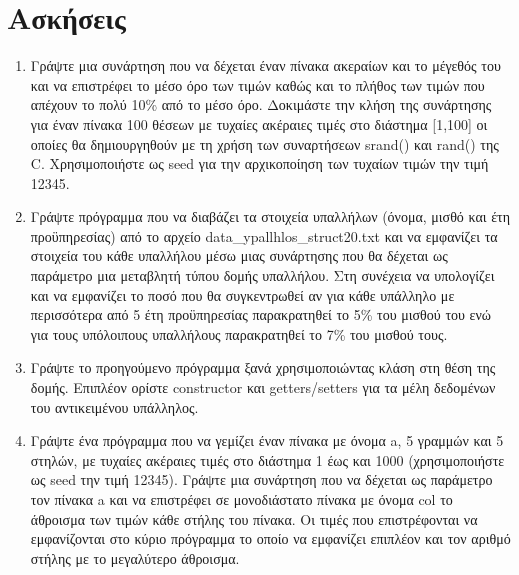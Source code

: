 \section{Ασκήσεις}
\begin{enumerate}[nolistsep]
\item Γράψτε μια συνάρτηση που να δέχεται έναν πίνακα ακεραίων και το μέγεθός του και να επιστρέφει το μέσο όρο των τιμών καθώς και το πλήθος των τιμών που απέχουν το πολύ 10\% από το μέσο όρο. Δοκιμάστε την κλήση της συνάρτησης για έναν πίνακα 100 θέσεων με τυχαίες ακέραιες τιμές στο διάστημα [1,100] οι οποίες θα δημιουργηθούν με τη χρήση των συναρτήσεων srand() και rand() της C. Χρησιμοποιήστε ως seed για την αρχικοποίηση των τυχαίων τιμών την τιμή 12345.

\item Γράψτε πρόγραμμα που να διαβάζει τα στοιχεία υπαλλήλων (όνομα, μισθό και έτη προϋπηρεσίας) από το αρχείο data\_ypallhlos\_struct20.txt και να εμφανίζει τα στοιχεία του κάθε υπαλλήλου μέσω μιας συνάρτησης που θα δέχεται ως παράμετρο μια μεταβλητή τύπου δομής υπαλλήλου. Στη συνέχεια να υπολογίζει και να εμφανίζει το ποσό που θα συγκεντρωθεί αν για κάθε υπάλληλο με περισσότερα από 5 έτη προϋπηρεσίας παρακρατηθεί το 5\% του μισθού του ενώ για τους υπόλοιπους υπαλλήλους παρακρατηθεί το 7\% του μισθού τους.

\item Γράψτε το προηγούμενο πρόγραμμα ξανά χρησιμοποιώντας κλάση στη θέση της δομής. Επιπλέον ορίστε constructor και getters/setters για τα μέλη δεδομένων του αντικειμένου υπάλληλος.

\item Γράψτε ένα πρόγραμμα που να γεμίζει έναν πίνακα με όνομα a, 5 γραμμών και 5 στηλών, με τυχαίες ακέραιες τιμές στο διάστημα 1 έως και 1000 (χρησιμοποιήστε ως seed την τιμή 12345). Γράψτε μια συνάρτηση που να δέχεται ως παράμετρο τον πίνακα a και να επιστρέφει σε μονοδιάστατο πίνακα με όνομα col το άθροισμα των τιμών κάθε στήλης του πίνακα. Οι τιμές που επιστρέφονται να εμφανίζονται στο κύριο πρόγραμμα το οποίο να εμφανίζει επιπλέον και τον αριθμό στήλης με το μεγαλύτερο άθροισμα.
\end{enumerate}



